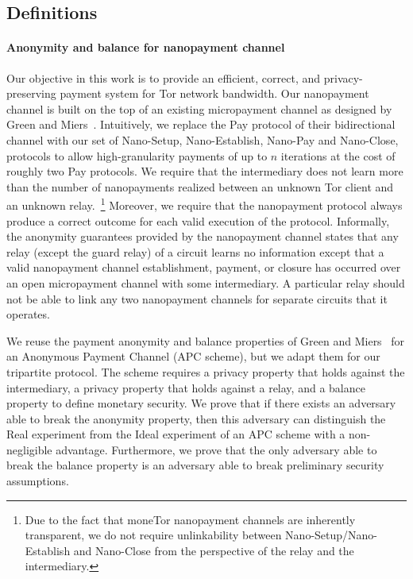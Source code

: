 \subsection{Definitions}

\paragraph*{Anonymity and balance for nanopayment channel} Our objective in this work is to provide an efficient, correct, and privacy-preserving payment system for Tor network bandwidth.
Our nanopayment channel is built on the top of an existing micropayment channel as designed by Green and Miers~\cite{green2017bolt}.
Intuitively, we replace the Pay protocol of their bidirectional channel with our set of Nano-Setup, Nano-Establish, Nano-Pay and Nano-Close, protocols to allow high-granularity payments of up to $n$ iterations at the cost of roughly two Pay protocols.
We require that the intermediary does not learn more than the number of nanopayments realized between an unknown Tor client and an unknown relay.~\footnote{Due to the fact that moneTor nanopayment channels are inherently transparent, we do not require unlinkability between Nano-Setup/Nano-Establish and Nano-Close from the perspective of the relay and the intermediary.}
Moreover, we require that the nanopayment protocol always produce a correct outcome for each valid execution of the protocol.
Informally, the anonymity guarantees provided by the nanopayment channel states that any relay (except the guard relay) of a circuit learns no information except that a valid nanopayment channel establishment, payment, or closure has occurred over an open micropayment channel with some intermediary.
A particular relay should not be able to link any two nanopayment channels for separate circuits that it operates.

We reuse the payment anonymity and balance properties of Green and Miers~\cite{bolt-eprint} for an Anonymous Payment Channel (APC scheme), but we adapt them for our tripartite protocol.
The scheme requires a privacy property that holds against the intermediary, a privacy property that holds against a relay, and a balance property to define monetary security.
We prove that if there exists an adversary able to break the anonymity property, then this adversary can distinguish the Real experiment from the Ideal experiment of an APC scheme with a non-negligible advantage.
Furthermore, we prove that the only adversary able to break the balance property is an adversary able to break preliminary security assumptions.

